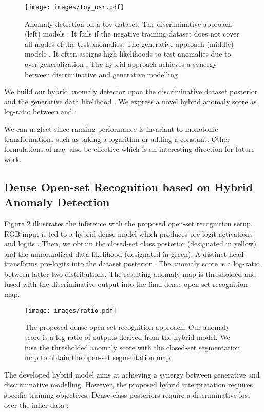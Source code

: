 \documentclass[runningheads]{llncs}
\begin{document}
\begin{figure}
    \centering
    \texttt{[image: images/toy\_osr.pdf]}
    \caption{Anomaly detection on a toy dataset. The discriminative approach (left) models . It fails if the negative training dataset does not cover all modes of the test anomalies. The generative approach (middle) models . It often assigns high likelihoods to test anomalies due to over-generalization \cite{lucas19nips}. The hybrid approach achieves a synergy between discriminative and generative modelling}
    \label{fig:osr_poc}
\end{figure}

We build our hybrid anomaly detector upon the discriminative dataset posterior  and the generative data likelihood .
We express a novel hybrid anomaly score as log-ratio 
between  and :

We can neglect  since ranking performance \cite{hendrycks17iclr} is invariant to monotonic transformations such as taking a logarithm or adding a constant.
Other formulations of  may also be effective which is an interesting direction for future work.

\subsection{Dense Open-set Recognition based on Hybrid Anomaly Detection
\label{sec:ratio_train}}


Figure \ref{fig:ratio} illustrates the inference with the proposed open-set recognition setup.
RGB input is fed to a hybrid dense model which produces pre-logit activations  and logits
.
Then, we obtain the closed-set class posterior  (designated in yellow) and the unnormalized data likelihood  (designated in green).
A distinct head  transforms pre-logits  
into the dataset posterior .
The anomaly score  is a log-ratio between latter two distributions.
The resulting anomaly map is thresholded and fused with the discriminative output into the final dense open-set recognition map.
\begin{figure}[ht]
    \centering
    \texttt{[image: images/ratio.pdf]}
    \caption{The proposed dense open-set recognition approach. Our anomaly score is a log-ratio of outputs derived from the hybrid model. We fuse the thresholded anomaly score with the closed-set segmentation map to obtain the open-set segmentation map}
    \label{fig:ratio}
\end{figure}

The developed hybrid model aims at achieving a synergy between generative and discriminative modelling.
However, the proposed hybrid interpretation requires 
specific training objectives.
Dense class posteriors require a discriminative loss over the inlier data :
\end{document}
